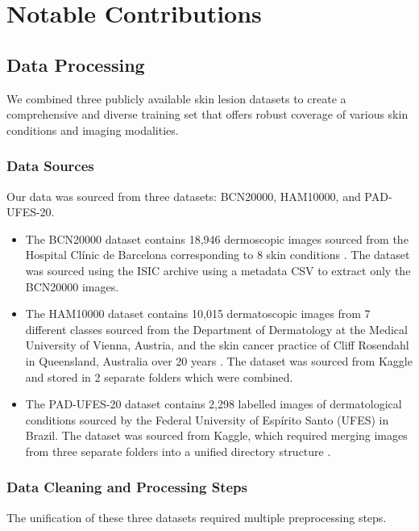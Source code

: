 \documentclass{article} %
\begin{document}
\section{Notable Contributions}

\subsection{Data Processing}

We combined three publicly available skin lesion datasets to create a comprehensive and diverse training set that offers robust coverage of various skin conditions and imaging modalities.

\subsubsection{Data Sources}

Our data was sourced from three datasets: BCN20000, HAM10000, and PAD-UFES-20.

\begin{itemize}
\item The BCN20000 dataset contains 18,946 dermoscopic images sourced from the Hospital Clínic de Barcelona corresponding to 8 skin conditions \citep{isic_bcn20000}. The dataset was sourced using the ISIC archive using a metadata CSV to extract only the BCN20000 images.
\item The HAM10000 dataset contains 10,015 dermatoscopic images from 7 different classes sourced from the Department of Dermatology at the Medical University of Vienna, Austria, and the skin cancer practice of Cliff Rosendahl in Queensland, Australia over 20 years \citep{ham10000_dataset}. The dataset was sourced from Kaggle and stored in 2 separate folders which were combined.
\item The PAD-UFES-20 dataset contains 2,298 labelled images of dermatological conditions sourced by the Federal University of Espírito Santo (UFES) in Brazil. The dataset was sourced from Kaggle, which required merging images from three separate folders into a unified directory structure \citep{pad_ufes_dataset}.
\end{itemize}

\subsubsection{Data Cleaning and Processing Steps}

The unification of these three datasets required multiple preprocessing steps.
\end{document}
